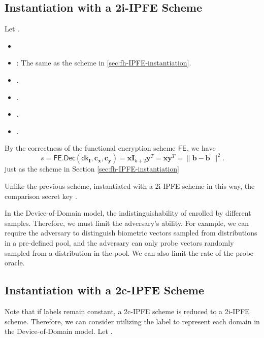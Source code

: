 \iffalse

\subsection{Instantiation with a 2i-IPFE Scheme}
\label{sec:2i-IPFE-instantiation}

Let .

\begin{itemize}

	\item 

	\item : The same as the scheme in \ref{sec:fh-IPFE-instantiation}. 

	\item .

	\item .

	\item .

	\item .

\end{itemize}

By the correctness of the functional encryption scheme $\sf FE$, we have
\[
	s = \mathsf{FE.Dec}(\mathsf{dk}_{\mathbf{I}}, \mathbf{c_x}, \mathbf{c_y}) =  \mathbf{x} \mathbf{I}_{k+2} \mathbf{y}^T = \mathbf{x} \mathbf{y}^T = \| \mathbf{b} - \mathbf{b}^\prime \|^2.
\]
just as the scheme in Section \ref{sec:fh-IPFE-instantiation}


Unlike the previous scheme, instantiated with a 2i-IPFE scheme in this way, the comparison secret key .

In the Device-of-Domain model, the indistinguishability of  enrolled by different samples. Therefore, we must limit the adversary's ability. For example, we can require the adversary to distinguish biometric vectors sampled from distributions in a pre-defined pool, and the adversary can only probe vectors randomly sampled from a distribution in the pool. We can also limit the rate of the probe oracle.


\subsection{Instantiation with a 2c-IPFE Scheme}
\label{sec:2c-IPFE-instantiation}

Note that if labels remain constant, a 2c-IPFE scheme is reduced to a 2i-IPFE scheme. Therefore, we can consider utilizing the label to represent each domain in the Device-of-Domain model. Let .

